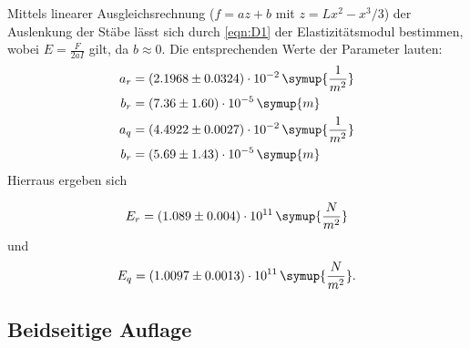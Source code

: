 Mittels linearer Ausgleichsrechnung ($f = a z +b$ mit $z = Lx^2-x^3/3$) der Auslenkung der Stäbe lässt sich durch \eqref{eqn:D1} der Elastizitätsmodul bestimmen, wobei $E = \frac{F}{2aI}$ gilt, da $b \approx 0$. Die entsprechenden Werte der Parameter lauten:
\begin{align}
  a_r &= \left( 2.1968\pm 0.0324 \right)  \cdot 10^{-2}  \, \symup{\frac{1}{m^2}} \\
  b_r &= \left(7.36 \pm 1.60 \right) \cdot 10^{-5} \, \symup{m}                   \\
  a_q &= \left(4.4922 \pm 0.0027 \right)  \cdot 10^{-2}  \, \symup{\frac{1}{m^2}} \\
  b_r &= \left(5.69 \pm 1.43 \right) \cdot 10^{-5} \, \symup{m}
\end{align}
 Hierraus ergeben sich

\begin{equation*}
  E_r = \left(1.089 \pm 0.004\right)\cdot 10^{11} \, \symup{\frac{N}{m^2}}
\end{equation*}
und
\begin{equation*}
  E_q = \left(1.0097 \pm 0.0013 \right)\cdot 10^{11} \, \symup{\frac{N}{m^2}}.
\end{equation*}



\subsection{Beidseitige Auflage}
\label{sec:Beidseitig}

